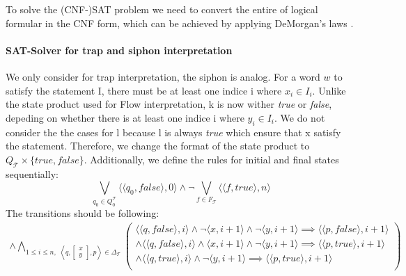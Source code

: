To solve the (CNF-)SAT problem we need to convert the entire of 
logical formular in the CNF form, 
which can be achieved by applying DeMorgan's laws \cite{enwiki:1184283195}.

\paragraph*{SAT-Solver for trap and siphon interpretation}
We only consider for trap interpretation, the 
siphon is analog.
For a word $w$ to satisfy the statement I, there must be at least one indice
i where $x_i \in I_i$.
Unlike the state product used for Flow interpretation, k is now wither \textit{true} or \textit{false}, 
depeding on whether there is at least one indice i
where $y_i \in I_i$.
We do not consider the the cases for l because l is always \textit{true}
which ensure that x satisfy the statement.
Therefore, we change the format of the state product to 
$Q_{\mathcal{T}} \times \{true, false\}$. 
Additionally, we define the rules for initial and final states sequentially: 
\begin{equation*}
    \bigvee_{q_0 \in Q_0^{\mathcal{T}}} \langle \langle q_0, false\rangle , 0 \rangle \wedge \lnot \bigvee_{f \in F_{\mathcal{T}}} \langle \langle f,true \rangle,n \rangle
\end{equation*}
The transitions should be following:
\begin{multline}
    \wedge \bigwedge_{1 \leq i \leq n, \,\, \left\langle q, \left[\substack{x \\ y}\right],p \right\rangle \in \Delta_{\mathcal{T}}}
    \begin{pmatrix}
        \langle \langle q,false \rangle,i \rangle \wedge \lnot \langle x, i+1 \rangle \wedge \lnot \langle y, i+1 \rangle \implies \langle \langle p,false \rangle,i+1 \rangle \\
        \wedge \langle \langle q,false \rangle,i \rangle \wedge \langle x, i+1 \rangle \wedge \lnot \langle y, i+1 \rangle \implies \langle \langle p,true \rangle,i+1 \rangle \\
        \wedge \langle \langle q,true \rangle,i \rangle \wedge \lnot \langle y, i+1 \rangle \implies \langle \langle p,true \rangle,i+1 \rangle \\
    \end{pmatrix}
\end{multline}

